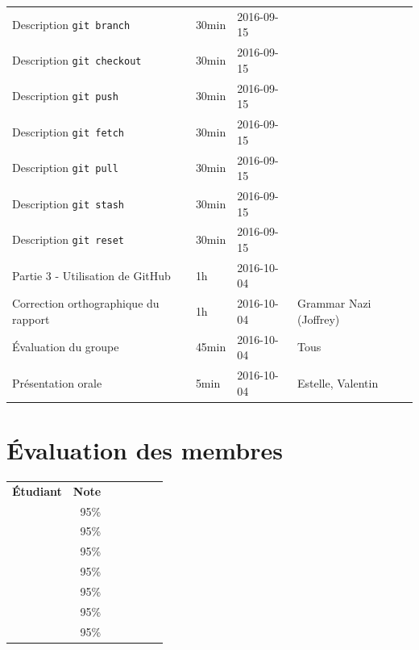 \documentclass[11pt,canadien]{article}
\begin{document}
\begin{appendices}
\begin{tabular}{l l l l}
	\\ Description \texttt{git branch}      & 30min & 2016-09-15 & \karen
	\\ Description \texttt{git checkout}    & 30min & 2016-09-15 & \karen
	\\ Description \texttt{git push}        & 30min & 2016-09-15 & \kevin
	\\ Description \texttt{git fetch}       & 30min & 2016-09-15 & \kevin
	\\ Description \texttt{git pull}        & 30min & 2016-09-15 & \kevin
	\\ Description \texttt{git stash}       & 30min & 2016-09-15 & \antoine
	\\ Description \texttt{git reset}       & 30min & 2016-09-15 & \antoine
	\\ Partie 3 - Utilisation de GitHub     & 1h    & 2016-10-04 & \joffrey
	\\ Correction orthographique du rapport & 1h    & 2016-10-04 & Grammar Nazi (Joffrey)
	\\ Évaluation du groupe                 & 45min & 2016-10-04 & Tous
	\\ Présentation orale                   & 5min  & 2016-10-04 & Estelle, Valentin
\end{tabular}

\section{Évaluation des membres}
\begin{tabular}{r r r r r r r}
	\textbf{Étudiant}  & \textbf{Note} \\
	\textbf{\antoine}  & 95\%          \\
	\textbf{\estelle}  & 95\%          \\
	\textbf{\joffrey}  & 95\%          \\
	\textbf{\julien}   & 95\%          \\
	\textbf{\karen}    & 95\%          \\
	\textbf{\kevin}    & 95\%          \\
	\textbf{\valentin} & 95\%
\end{tabular}

\end{appendices}
\end{document}
